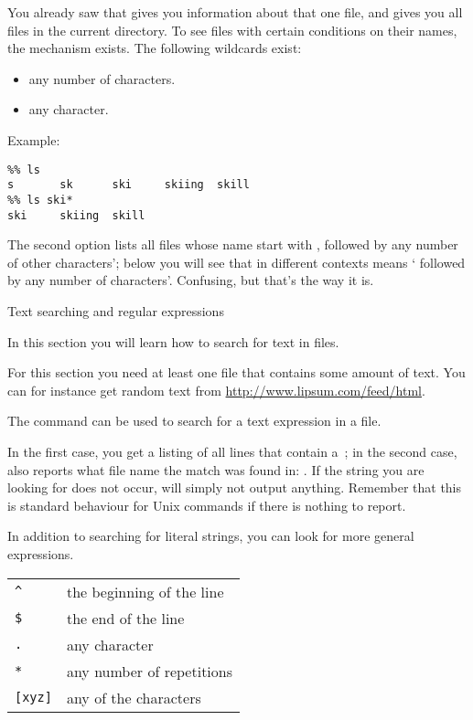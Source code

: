 You already saw that  gives you information about that
one file, and  gives you all files in the current directory. To
see files with certain conditions on their names, the
 mechanism exists. The following wildcards exist:
\begin{itemize}
\item [\n{*}] any number of characters.
\item [\n{?}] any character.
\end{itemize}
Example:
\begin{verbatim}
%% ls
s       sk      ski     skiing  skill
%% ls ski*
ski     skiing  skill
\end{verbatim}
The second option lists all files whose name start with
, followed by any number of other characters'; below you will
see that in different contexts  means ` followed by any
number of  characters'. Confusing, but that's the way it is.

 {Text searching and regular expressions}

\begin{purpose}
  In this section you will learn how to search for text in files.
\end{purpose}

For this section you need at least one file that contains some amount
of text. You can for instance get random text from
\url{http://www.lipsum.com/feed/html}. 

The  command can be used to search for a text expression in a
file.

{In the first case, you get a listing of all lines that contain
  a~; in the second case,  also reports what file name
  the match was found in: .}
{If the string you are looking for does not occur,  will
  simply not output anything. Remember that this is standard behaviour
for Unix commands if there is nothing to report.}

In addition to searching for literal strings, you can look for more
general expressions.

\begin{tabular}{|l|l|} 
  \hline
  \verb+^+&the beginning of the line\\
  \verb+$+&the end of the line\\
  \verb+.+&any character\\
  \verb+*+&any number of repetitions \\
  \verb+[xyz]+&any of the characters \n{xyz}\\
  \hline
\end{tabular}

